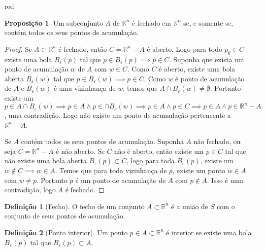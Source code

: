 \documentclass[12pt,leqno,twoside]{amsart}
\theoremstyle{definition}
\newtheorem{proposicao}{Proposição}[section]
\newtheorem{definicao}{Definição}[section]
\begin{document}
\begin{color}{red}
\vspace{0.3cm}

\begin{proposicao}
	Um subconjunto $A$ de $\mathbb{R}^n$ é fechado em $\mathbb{R}^n$ se, e somente se, contém todos os seus pontos de acumulação.
\end{proposicao}
\begin{proof}
	Se $A\subset\mathbb{R}^n$ é fechado, então $C = \mathbb{R}^n -A$ é aberto. Logo para todo $p_0\in C$ existe uma bola $B_{\varepsilon}(p)$ tal que $p \in B_{\varepsilon}(p) \implies p \in C$. Suponha que exista um ponto de acumulação $w$ de $A$ com $w\in C$. Como $C$ é aberto, existe uma bola aberta $B_{\varepsilon}(w)$ tal que $p \in B_{\varepsilon}(w) \implies p \in C$. Como $w$ é ponto de acumulação de $A$ e $B_{\varepsilon}(w)$  é uma vizinhança de $w$, temos que $A\cap  B_{\varepsilon}(w) \neq \emptyset $.  Portanto existe um $p\in A\cap B_{\varepsilon}(w) \implies p \in A \land p\in \cap B_{\varepsilon}(w) \implies p \in A \land p \in C \implies p \in A \land p \in \mathbb{R}^n -A$, uma contradição. Logo não existe um ponto de acumulação pertencente a $\mathbb{R}^n -A$.

	Se $A$ contém todos os seus pontos de acumulação. Suponha $A$ não fechado, ou seja $C = \mathbb{R}^n -A$ é não aberto. Se $C$ não é aberto, então existe um $p\in C$ tal que não existe uma bola aberta $B_{\varepsilon}(p) \subset C$, logo para toda $B_{\varepsilon}(p)$, existe um $w \not\in C \implies w\in A$. Temos que para toda vizinhança de $p$, existe um ponto $ w \in A$ com $w\neq p$. Portanto $p$ é um ponto de acumulação de $A$ com $p\not \in A$. Isso é uma contradição, logo $A$ é fechado.
\end{proof}

\vspace{0.3cm}

\begin{definicao}[Fecho]
	O fecho de um conjunto $A\subset \mathbb{R}^n$ é a união de $S$ com o conjunto de seus pontos de acumulação.
\end{definicao}

\vspace{0.3cm}

\begin{definicao}[Ponto interior]
	Um ponto $ p \in A\subset \mathbb{R}^n$ é interior se existe uma bola $B_{\varepsilon}(p)$ tal que $B_{\varepsilon}(p) \subset A$.
\end{definicao}

\vspace{0.3cm}


\end{color}
\end{document}
